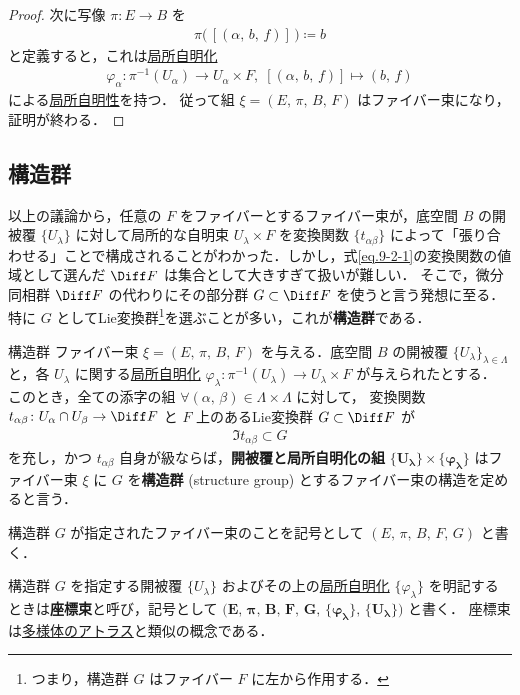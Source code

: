 \documentclass[geometry_main]{subfiles}
\begin{document}
\begin{proof}
	次に\cinfty 写像 $\pi \colon E \to B$ を
	\begin{align}
		\pi \bigl(\, [(\alpha,\, b,\, f)]\, \bigr) \coloneqq b
	\end{align}
	と定義すると，これは\hyperref[def.fiber-1]{局所自明化} 
	\begin{align}
		\varphi_\alpha \colon \pi^{-1}(U_\alpha) \to U_\alpha \times F,\; [(\alpha,\, b,\, f)] \mapsto (b,\, f)
	\end{align}
	による\hyperref[fig.bundle_homo]{局所自明性}を持つ．
	従って組 $\xi = (E,\, \pi,\, B,\, F)$ はファイバー束になり，証明が終わる．
\end{proof}


\subsection{構造群}

以上の議論から，任意の $F$ をファイバーとするファイバー束が，底空間 $B$ の開被覆 $\{U_\lambda\}$ に対して局所的な自明束 $U_\lambda \times F$ を変換関数 $\{ t_{\alpha\beta}\}$ によって「張り合わせる」ことで構成されることがわかった．しかし，式\eqref{eq.9-2-1}の変換関数の値域として選んだ $\Diff F$ は集合として大きすぎて扱いが難しい．
そこで，微分同相群 $\Diff F$ の代わりにその部分群 $G \subset \Diff F$ を使うと言う発想に至る．
特に $G$ としてLie変換群\footnote{つまり，構造群 $G$ はファイバー $F$ に左から作用する．}を選ぶことが多い，これが\textbf{構造群}である．

\begin{mydef}[label=def.structure_group]{構造群}
	ファイバー束 $\xi = (E,\, \pi,\, B,\, F)$ を与える．底空間 $B$ の開被覆 $\{U_\lambda\}_{\lambda \in \Lambda}$ と，各 $U_\lambda$ に関する\hyperref[def.fiber-1]{局所自明化} $\varphi_\lambda \colon \pi^{-1}(U_\lambda) \to U_\lambda \times F$ が与えられたとする．
	このとき，全ての添字の組 $\forall (\alpha,\, \beta) \in \Lambda \times \Lambda$ に対して，
	変換関数 $t_{\alpha\beta} \colon U_\alpha \cap U_\beta \to \Diff F$ と $F$ 上のあるLie変換群 $G \subset \Diff F$ が
	\begin{align}
		\Im t_{\alpha\beta} \subset G
	\end{align}
	を充し，かつ $t_{\alpha\beta}$ 自身が\cinfty 級ならば，\textbf{開被覆と局所自明化の組} $\bm{\{U_\lambda\} \times \{\varphi_\lambda\}}$ はファイバー束 $\xi$ に $G$ を\textbf{構造群} (structure group) とするファイバー束の構造を定めると言う．

	構造群 $G$ が指定されたファイバー束のことを記号として $(E,\, \pi,\, B,\, F,\, G)$ と書く．
\end{mydef}
構造群 $G$ を指定する開被覆 $\{U_\lambda\}$ およびその上の\hyperref[def.fiber-1]{局所自明化} $\{	\varphi_\lambda \}$ を明記するときは\textbf{座標束}と呼び，記号として $\bm{\bigl( E,\, \pi ,\, B,\, F,\, G,\, \{ \varphi_\lambda\},\, \{U_\lambda\} \bigr)}$ と書く．
座標束は\hyperref[def.atlas]{多様体のアトラス}と類似の概念である．
\end{document}
